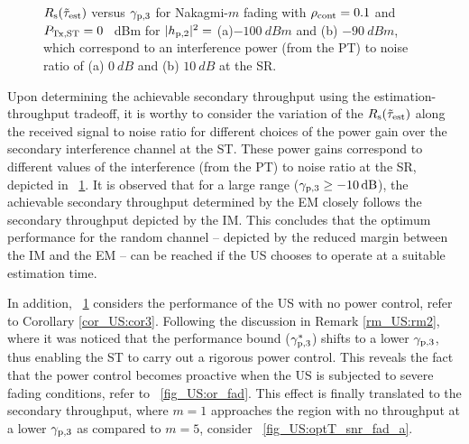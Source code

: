 \begin{figure}[!ht]
{
\label{fig_US:optT_snr_fad_b}
}
\vspace{-2mm}
\caption{$R_{\text{s}}(\tilde{\tau}_{\text{est}})$ versus ${\gamma}_{\text{p,3}}$ for Nakagmi-$m$ fading with $\rho_{\text{cont}} = 0.1$ and $P_{\text{Tx,ST}} = 0$ \SI{}{dBm} for $|h_{\text{p,2}}|^2 =$ (a)$\SI{-100}{dBm}$ and (b) $ \SI{-90}{dBm}$, which correspond to an interference power (from the PT) to noise ratio of (a) $\SI{0}{dB}$ and (b) $\SI{10}{dB}$ at the SR.}
\label{fig_US:optT_snr_fad}
\end{figure}

Upon determining the achievable secondary throughput using the estimation-throughput tradeoff, it is worthy to consider the variation of the $R_{\text{s}}(\tilde{\tau}_{\text{est}})$ along the received signal to noise ratio for different choices of the power gain over the secondary interference channel at the ST. These power gains correspond to different values of the interference (from the PT) to noise ratio at the SR, depicted in \figurename~\ref{fig_US:optT_snr_fad}. It is observed that for a large range (${\gamma}_{\text{p,3}} \ge \SI{-10}{dB}$), the achievable secondary throughput determined by the EM closely follows the secondary throughput depicted by the IM. This concludes that the optimum performance for the random channel -- depicted by the reduced margin between the IM and the EM -- can be reached if the US chooses to operate at a suitable estimation time. 

In addition, \figurename~\ref{fig_US:optT_snr_fad} considers the performance of the US with no power control, refer to Corollary \ref{cor_US:cor3}. Following the discussion in Remark \ref{rm_US:rm2}, where it was noticed that the performance bound (${\gamma}_{\text{p,3}}^*$) shifts to a lower ${\gamma}_{\text{p,3}}$, thus enabling the ST to carry out a rigorous power control. This reveals the fact that the power control becomes proactive when the US is subjected to severe fading conditions, refer to \figurename~\ref{fig_US:or_fad}. This effect is finally translated to the secondary throughput, where $m = 1$ approaches the region with no throughput at a lower ${\gamma}_{\text{p,3}}$ as compared to $m = 5$, consider \figurename~\ref{fig_US:optT_snr_fad_a}. 
